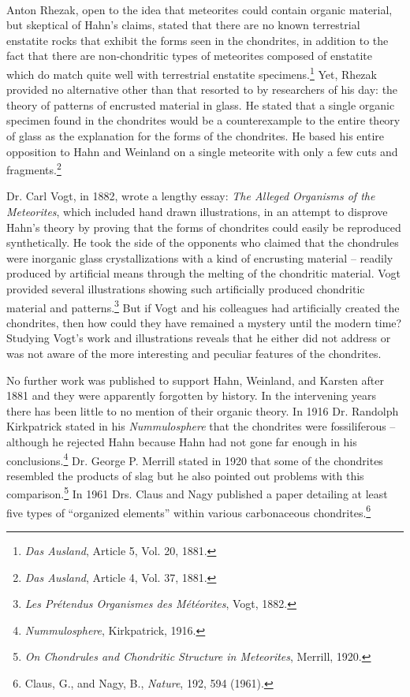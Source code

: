 \documentclass[a4paper, 12pt, oneside]{article}
\begin{document}
\paragraph*{}
Anton Rhezak, open to the idea that meteorites could contain organic material, but skeptical of Hahn's claims, stated that there are no known terrestrial enstatite rocks that exhibit the forms seen in the chondrites, in addition to the fact that there are non-chondritic types of meteorites composed of enstatite which do match quite well with terrestrial enstatite specimens.\footnote{\emph{Das Ausland}, Article 5, Vol. 20, 1881.} Yet, Rhezak provided no alternative other than that resorted to by researchers of his day: the theory of patterns of encrusted material in glass. He stated that a single organic specimen found in the chondrites would be a counterexample to the entire theory of glass as the explanation for the forms of the chondrites. He based his entire opposition to Hahn and Weinland on a single meteorite with only a few cuts and fragments.\footnote{\emph{Das Ausland}, Article 4, Vol. 37, 1881.}

Dr. Carl Vogt, in 1882, wrote a lengthy essay: \emph{The Alleged Organisms of the Meteorites}, which included hand drawn illustrations, in an attempt to disprove Hahn's theory by proving that the forms of chondrites could easily be reproduced synthetically. He took the side of the opponents who claimed that the chondrules were inorganic glass crystallizations with a kind of encrusting material -- readily produced by artificial means through the melting of the chondritic material. Vogt provided several illustrations showing such artificially produced chondritic material and patterns.\footnote{\emph{Les Prétendus Organismes des Météorites}, Vogt, 1882.} But if Vogt and his colleagues had artificially created the chondrites, then how could they have remained a mystery until the modern time? Studying Vogt's work and illustrations reveals that he either did not address or was not aware of the more interesting and peculiar features of the chondrites.

No further work was published to support Hahn, Weinland, and Karsten after 1881 and they were apparently forgotten by history. In the intervening years there has been little to no mention of their organic theory. In 1916 Dr. Randolph Kirkpatrick stated in his \emph{Nummulosphere} that the chondrites were fossiliferous -- although he rejected Hahn because Hahn had not gone far enough in his conclusions.\footnote{\emph{Nummulosphere}, Kirkpatrick, 1916.} Dr. George P. Merrill stated in 1920 that some of the chondrites resembled the products of slag but he also pointed out problems with this comparison.\footnote{\emph{On Chondrules and Chondritic Structure in Meteorites}, Merrill, 1920.} In 1961 Drs. Claus and Nagy published a paper detailing at least five types of ``organized elements'' within various carbonaceous chondrites.\footnote{Claus, G., and Nagy, B., \emph{Nature}, 192, 594 (1961).}
\end{document}
